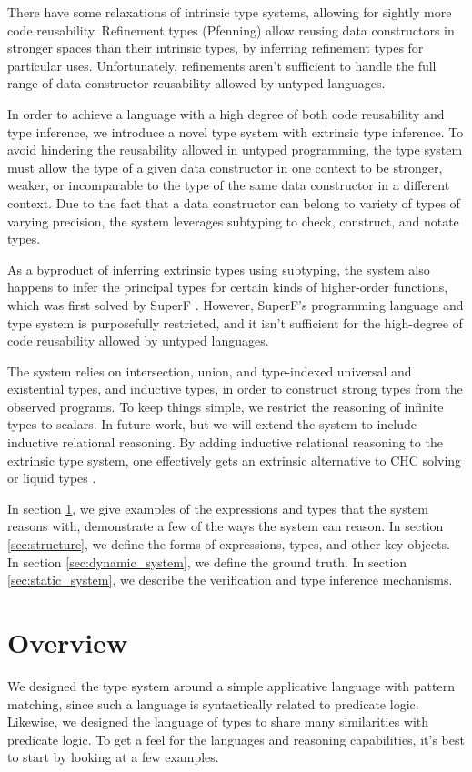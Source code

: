 \documentclass[acmsmall]{acmart}
\theoremstyle{definition}
\begin{document}
There have some relaxations of intrinsic type systems, allowing for sightly more code reusability.
Refinement types (Pfenning) \cite{} allow reusing data constructors in stronger spaces than their intrinsic types, by
inferring refinement types for particular uses.
Unfortunately, refinements aren't sufficient to handle the full range of data constructor reusability allowed by untyped languages.

In order to achieve a language with a high degree of both code reusability and type inference, 
we introduce a novel type system with extrinsic type inference. 
To avoid hindering the reusability allowed in untyped programming, 
the type system must allow the type of a given data constructor in one context
to be stronger, weaker, or incomparable to the type of 
the same data constructor in a different context. 
Due to the fact that a data constructor can belong to variety of types of varying precision,
the system leverages subtyping to check, construct, and notate types.

As a byproduct of inferring extrinsic types using subtyping, the system also happens to infer the principal types for 
certain kinds of higher-order functions, which was first solved by SuperF \cite{}. 
However, SuperF's programming language and type system is purposefully 
restricted, and it isn't sufficient for the high-degree of code reusability allowed by untyped languages.

The system relies on intersection, union, and type-indexed universal and existential types, and inductive types, in order 
to construct strong types from the observed programs. 
To keep things simple, we restrict the reasoning of infinite types to scalars. In future work, 
but we will extend the system to include inductive relational reasoning. By adding inductive relational
reasoning to the extrinsic type system, one effectively gets an extrinsic alternative to CHC solving \cite{} 
or liquid types \cite{}.


In section \ref{sec:overview}, we give examples of the expressions and types that the system reasons with,
demonstrate a few of the ways the system can reason. 
In section \ref{sec:structure}, we define the forms of expressions, types, and other key objects. 
In section \ref{sec:dynamic_system}, we define the ground truth.
In section \ref{sec:static_system}, we describe the verification and type inference mechanisms.


\section{Overview}
\label{sec:overview}
We designed the type system around a simple applicative language with pattern matching,
since such a language is syntactically related to predicate logic. Likewise,
we designed the language of types to share many similarities with predicate logic. 
To get a feel for the languages and reasoning capabilities, it's best to start by
looking at a few examples.
\end{document}
